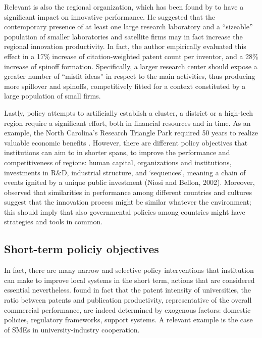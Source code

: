 Relevant is also the regional organization, which has been found by \citet{Agrawal2014} to have a significant impact on innovative performance. He suggested that the contemporary presence of at least one large research laboratory and a \enquote{sizeable} population of smaller laboratories and satellite firms may in fact increase the regional innovation productivity. In fact, the author empirically evaluated this effect in a 17\% increase of citation-weighted patent count per inventor, and a 28\% increase of spinoff formation. Specifically, a larger research center should expose a greater number of \enquote{misfit ideas} in respect to the main activities, thus producing more spillover and spinoffs, competitively fitted for a context constituted by a large population of small firms.

Lastly, policy attempts to artificially establish a cluster, a district or a high-tech region require a significant effort, both in financial resources and in time. As an example, the North Carolina's Research Triangle Park required 50 years to realize valuable economic benefits \citep{Bercovitz2006}. However, there are different policy objectives that institutions can aim to in shorter spans, to improve the performance and competitiveness of regions: human capital, organizations and institutions, investments in R\&D, industrial structure, and ‘sequences', meaning a chain of events ignited by a unique public investment (Niosi and Bellon, 2002). Moreover, \citet{Heher2006} observed that similarities in performance among different countries and cultures suggest that the innovation process might be similar whatever the environment; this should imply that also governmental policies among countries might have strategies and tools in common.  

\subsection{Short-term policiy objectives}

In fact, there are many narrow and selective policy interventions that institution can make to improve local systems in the short term, actions that are considered essential nevertheless. \citet{Tijssen2006} found in fact that the patent intensity of universities, the ratio between patents and publication productivity, representative of the overall commercial performance, are indeed determined by exogenous factors: domestic policies, regulatory frameworks, support systems. A relevant example is the case of SMEs in university-industry cooperation.

